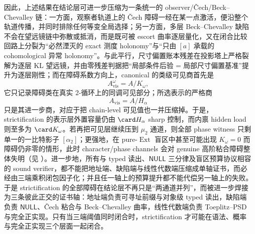 



\noindent
因此，上述结果在结论层可进一步压缩为一条统一的 observer/Čech/Beck--Chevalley 链：一方面，观察者轨道上的 Čech 障碍一经在某一点激活，便沿整个轨道传播，并同时排除任何等变全局选择；另一方面，多层 Beck--Chevalley 缺陷不会在望远镜链中弥散或抵消，而是既可被 escort 曲率逐层量化，又在闭合比较回路上分裂为“必然湮灭的 exact 测度 holonomy”与“只由 \([a]\) 承载的 cohomological 异常 holonomy”。与此平行，尺寸偏置账本残差在投影塔上严格裂解为逐层 KL 望远镜，并由零残差判据把“局部条件后验 = 局部尺寸偏置基准”提升为逐层刚性；而在障碍系数方向上，canonical 的类级可见商首先是
\[
A_{\mathrm{vis}}^\omega=A/K_\omega,
\]
它只记录障碍类在真实 \(2\)-循环上的同调可见部分；所选表示的严格商
\[
A_{\mathrm{vis}}=A/H_\alpha
\]
只是其进一步商，对应于把 chain-level 可见值也一并压缩掉。于是，strictification 的表示层外置容量仍由 \(\card H_\alpha\) sharp 控制，而内禀 hidden load 则至多为 \(\card K_\omega\)。若再把可见层继续压到 \(\mu_2\) 通道，则全部 phase witness 只剩单一的一比特影子 \([\alpha_2]\)；更强地，在 pure-\(\operatorname{Ext}\) 盲区中甚至可能出现 \(K_\omega=0\) 而障碍仍非零的情形，此时 character/phase channels 会对 genuine 高阶粘合障碍整体失明（见 \cite{MaZhang2026StateForcingSemantics}）。进一步地，所有与 typed 读出、\(\mathsf{NULL}\) 三分律及盲区预算协议相容的 sound verifier，都不能把地址端、缺陷端与线性代数端压缩成单轴证书，而必经由三端乘积闭包因子化；并且任一轴上的预算提升都不能代偿另一轴上的失败。于是 strictification 的全部障碍在结论层不再只是“两通道并列”，而被进一步焊接为三条彼此正交的证书轴：地址端负责可寻址前缀与对象级 typed 读出，缺陷端负责 \(\mathsf{NULL}\)、Čech 粘合与 Beck--Chevalley 曲率，线性代数端负责 Toeplitz--PSD 与完全正实现。只有当三端阈值同时闭合时，strictification 才可能在语法、概率与完全正实现三个层面一起闭合。

\endinput
